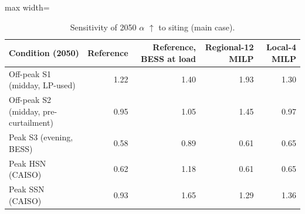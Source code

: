\begin{table}[!htbp]
\centering
\small
\caption{Sensitivity of 2050 $\alpha$ $\uparrow$ to siting (main case).}
\label{tab:siting}
\begin{adjustbox}{max width=\linewidth}
\begin{tabular}{lrrrr}
\toprule
Condition (2050) & Reference & Reference, BESS at load & Regional-12 MILP & Local-4 MILP \\
\midrule
Off-peak S1 (midday, LP-used) & 1.22 & 1.40 & 1.93 & 1.30 \\
Off-peak S2 (midday, pre-curtailment) & 0.95 & 1.05 & 1.45 & 0.97 \\
Peak S3 (evening, BESS) & 0.58 & 0.89 & 0.61 & 0.65 \\
Peak HSN (CAISO) & 0.62 & 1.18 & 0.61 & 0.65 \\
Peak SSN (CAISO) & 0.93 & 1.65 & 1.29 & 1.36 \\
\bottomrule
\end{tabular}
\end{adjustbox}
\end{table}
